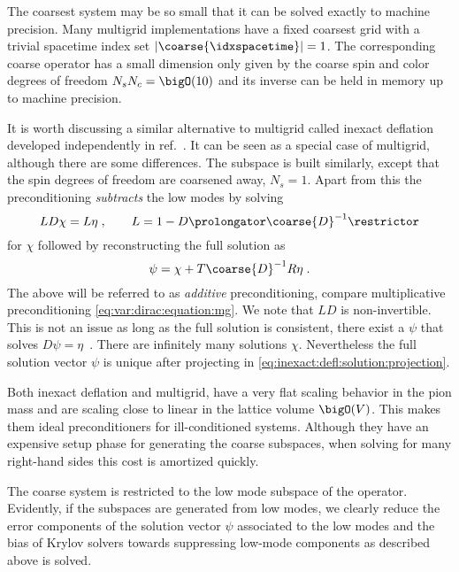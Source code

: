 The coarsest system may be so small that it can be solved exactly to machine precision.
Many multigrid implementations have a fixed coarsest grid with a trivial spacetime index set $\lvert \coarse{\idxspacetime} \rvert = 1$.
The corresponding coarse operator has a small dimension only given by the coarse spin and color degrees of freedom $N_s N_c = \bigO(10)$ and its inverse can be held in memory up to machine precision.

It is worth discussing a similar alternative to multigrid called inexact deflation developed independently in ref.~\cite{Luescher2007}.
It can be seen as a special case of multigrid, although there are some differences.
The subspace is built similarly, except that the spin degrees of freedom are coarsened away, $N_s = 1$.
Apart from this the preconditioning \emph{subtracts} the low modes by solving
\begin{equation} \label{eq:var:dirac:equation:inexact:defl}
L D \chi = L \eta \;,
\qquad
L = 1 - D \prolongator \coarse{D}^{-1} \restrictor
\end{equation}
for $\chi$ followed by reconstructing the full solution as
\begin{equation} \label{eq:inexact:defl:solution:projection}
\psi = \chi + T \coarse{D}^{-1} R \eta \;.
\end{equation}
The above will be referred to as \emph{additive} preconditioning, compare multiplicative preconditioning \cref{eq:var:dirac:equation:mg}.
We note that $L D$ is non-invertible.
This is not an issue as long as the full solution is consistent, \ie there exist a $\psi$ that solves $D \psi = \eta$~\cite{kaasschieter1988preconditioned}.
There are infinitely many solutions $\chi$.
Nevertheless the full solution vector $\psi$ is unique after projecting in \cref{eq:inexact:defl:solution:projection}.

Both inexact deflation and multigrid, have a very flat scaling behavior in the pion mass and are scaling close to linear in the lattice volume $\bigO(V)$.
This makes them ideal preconditioners for ill-conditioned systems.
Although they have an expensive setup phase for generating the coarse subspaces, when solving for many right-hand sides this cost is amortized quickly.

The coarse system is restricted to the low mode subspace of the operator.
Evidently, if the subspaces are generated from low modes, we clearly reduce the error components of the solution vector $\psi$ associated to the low modes and the bias of Krylov solvers towards suppressing low-mode components as described above is solved.

